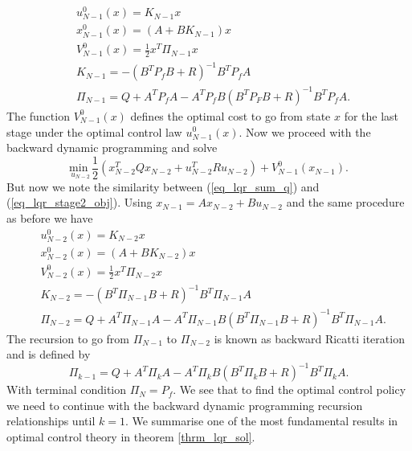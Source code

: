 \begin{equation}
\begin{aligned}
&u^0_{N-1}(x) = K_{N-1}x \\
&x^0_{N-1}(x) = (A+BK_{N-1})x \\
&V^0_{N-1}(x) = \frac{1}{2}x^T\Pi_{N-1}x \\
&K_{N-1} = -(B^TP_fB+R)^{-1}B^TP_fA \\
&\Pi_{N-1} = Q + A^TP_fA-A^TP_fB(B^TP_FB+R)^{-1}B^TP_fA. 
\end{aligned}
\label{eq_lqr_stage1}
\end{equation} 
The function $V^0_{N-1}(x)$ defines the optimal cost to go from state $x$ for the last stage under the optimal control law $u^0_{N-1}(x)$. Now we proceed with the backward dynamic programming and solve
\begin{equation}
\underset{u_{N-2}}{\text{min }}  \frac{1}{2}\left(x_{N-2}^TQx_{N-2} + u_{N-2}^TRu_{N-2} \right) + V^0_{N-1}(x_{N-1}).
\label{eq_lqr_stage2_obj}
\end{equation}
But now we note the similarity between (\ref{eq_lqr_sum_q}) and (\ref{eq_lqr_stage2_obj}). Using $x_{N-1}=Ax_{N-2}+Bu_{N-2}$ and the same procedure as before we have 
\begin{equation}
\begin{aligned}
&u^0_{N-2}(x) = K_{N-2}x \\
&x^0_{N-2}(x) = (A+BK_{N-2})x \\
&V^0_{N-2}(x) = \frac{1}{2}x^T\Pi_{N-2}x \\
&K_{N-2} = -(B^T\Pi_{N-1}B+R)^{-1}B^T\Pi_{N-1}A \\
&\Pi_{N-2} = Q + A^T\Pi_{N-1}A-A^T\Pi_{N-1}B(B^T\Pi_{N-1}B+R)^{-1}B^T\Pi_{N-1}A.
\end{aligned}
\label{eq_lqr_stage2}
\end{equation} 
The recursion to go from $\Pi_{N-1}$ to $\Pi_{N-2}$ is known as backward Ricatti iteration and is defined by
\begin{equation}
\Pi_{k-1} = Q + A^T\Pi_{k}A-A^T\Pi_{k}B(B^T\Pi_{k}B+R)^{-1}B^T\Pi_{k}A.  
\label{eq_ricatti}
\end{equation}
With terminal condition $\Pi_N = P_f$. We see that to find the optimal control policy we need to continue with the backward dynamic programming recursion relationships until $k = 1$. We summarise one of the most fundamental results in optimal control theory in theorem \ref{thrm_lqr_sol}.
